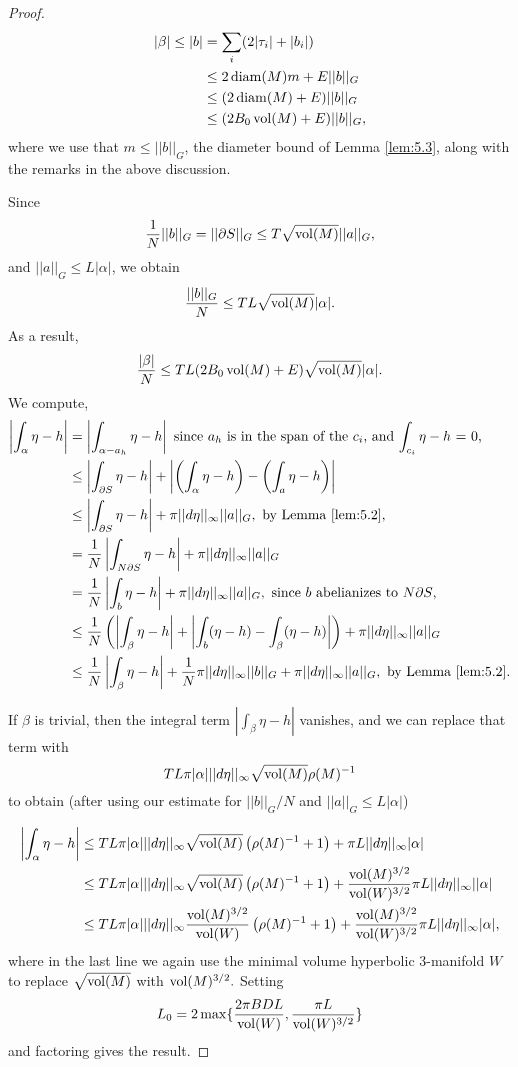\begin{proof}
\begin{align*}|\beta| \leq |b| &= \sum_i (2|\tau_i| + |b_i|) \\ &\leq 2\operatorname{diam}(M)m + E||b||_G \\ &\leq (2\operatorname{diam}(M) + E)||b||_G \\ &\leq (2B_0\operatorname{vol}(M) + E)||b||_G,
\end{align*}
where we use that $m \leq ||b||_G$, the diameter bound of Lemma \ref{lem:5.3}, along with the remarks in the above discussion.

Since $$\frac{1}{N}||b||_G = ||\partial S||_G \leq T\sqrt{\operatorname{vol}(M)}||a||_G,$$ and  $||a||_G\leq L|\alpha|$, we obtain $$\frac{||b||_G}{N} \leq TL\sqrt{\operatorname{vol}(M)}|\alpha|.$$ As a result, $$\frac{|\beta|}{N}\leq TL(2B_0\operatorname{vol}(M)+E)\sqrt{\operatorname{vol}(M)}|\alpha|.$$
We compute,
\begin{align*}
\left|\int_{\alpha}\eta-h\right| &= \left|\int_{\alpha-a_h} \eta-h \right|\text{~since $a_h$ is in the span of the $c_i$, and $\int_{c_i}\eta-h$ = 0,}\\
&\leq\left| \int_{\partial S}\eta- h\right| + \left|\left(\int_{\alpha} \eta - h\right) - \left(\int_{a}\eta-h\right)\right| \\
&\leq\left| \int_{\partial S}\eta- h\right| + \pi||d\eta||_{\infty}||a||_G,\text{~by Lemma \ref{lem:5.2},} \\
&= \frac{1}{N}\left|\int_{N\partial S}\eta-h\right| + \pi||d\eta||_{\infty}||a||_G\\
&= \frac{1}{N}\left|\int_{b}\eta-h\right| + \pi||d\eta||_{\infty}||a||_G,\text{~since $b$ abelianizes to $N\partial S$,}\\
&\leq \frac{1}{N}\left(\left|\int_{\beta}\eta-h\right| + \left|\int_b(\eta-h) - \int_{\beta}(\eta-h)\right|\right) + \pi||d\eta||_{\infty}||a||_G\\
&\leq \frac{1}{N}\left|\int_{\beta}\eta-h\right| + \frac{1}{N}\pi||d\eta||_{\infty}||b||_G + \pi||d\eta||_{\infty}||a||_G,\text{~by Lemma \ref{lem:5.2}}.
\end{align*}

If $\beta$ is trivial, then the integral term $|\int_{\beta}\eta-h| $ vanishes, and we can replace that term with $$TL\pi |\alpha| ||d\eta||_{\infty}\sqrt{\operatorname{vol}(M)}\rho(M)^{-1} $$ to obtain (after using our estimate for $||b||_G/N$ and $||a||_G \leq L|\alpha|$)

\begin{align*}
\left|\int_{\alpha}\eta-h\right| &\leq TL\pi|\alpha|||d\eta||_{\infty}\sqrt{\operatorname{vol}(M)}\left(\rho(M)^{-1}+1\right) + \pi L ||d\eta||_{\infty}|\alpha|\\
&\leq TL\pi|\alpha|||d\eta||_{\infty}\sqrt{\operatorname{vol}(M)}\left(\rho(M)^{-1}+1\right) + \frac{\operatorname{vol}(M)^{3/2}}{\operatorname{vol}(W)^{3/2}}\pi L ||d\eta||_{\infty}||\alpha|\\
&\leq TL\pi|\alpha|||d\eta||_{\infty}\frac{\operatorname{vol}(M)^{3/2}}{\operatorname{vol}(W)}\left(\rho(M)^{-1}+1\right) + \frac{\operatorname{vol}(M)^{3/2}}{\operatorname{vol}(W)^{3/2}}\pi L ||d\eta||_{\infty}|\alpha|,
\end{align*}
where in the last line we again use the minimal volume hyperbolic 3-manifold $W$ to replace $\sqrt{\operatorname{vol}(M)}$ with $\operatorname{vol}(M)^{3/2}.$
Setting $$L_0 = 2\max\{\frac{2\pi BDL}{\operatorname{vol}(W)},\frac{\pi L}{\operatorname{vol}(W)^{3/2}}\}$$ and factoring gives the result.


\end{proof}
